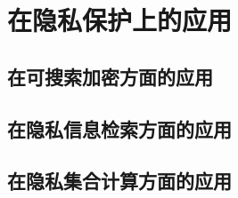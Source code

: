 
\chapter{在隐私保护上的应用}\label{chp:application}

\section{在可搜索加密方面的应用}

\section{在隐私信息检索方面的应用}

\section{在隐私集合计算方面的应用}
